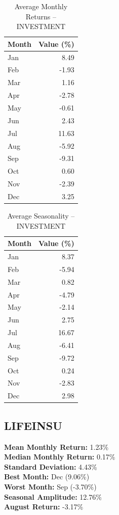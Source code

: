 \documentclass[12pt]{article}
\begin{document}
\begin{table}[h!]
\centering
\caption{Average Monthly Returns -- INVESTMENT}
\begin{tabular}{l r}
\toprule
Month & Value (\%) \\
\midrule
Jan & 8.49 \\
Feb & -1.93 \\
Mar & 1.16 \\
Apr & -2.78 \\
May & -0.61 \\
Jun & 2.43 \\
Jul & 11.63 \\
Aug & -5.92 \\
Sep & -9.31 \\
Oct & 0.60 \\
Nov & -2.39 \\
Dec & 3.25 \\
\bottomrule
\end{tabular}
\end{table}

\begin{table}[h!]
\centering
\caption{Average Seasonality -- INVESTMENT}
\begin{tabular}{l r}
\toprule
Month & Value (\%) \\
\midrule
Jan & 8.37 \\
Feb & -5.94 \\
Mar & 0.82 \\
Apr & -4.79 \\
May & -2.14 \\
Jun & 2.75 \\
Jul & 16.67 \\
Aug & -6.41 \\
Sep & -9.72 \\
Oct & 0.24 \\
Nov & -2.83 \\
Dec & 2.98 \\
\bottomrule
\end{tabular}
\end{table}


\clearpage

\subsection{LIFEINSU}
\textbf{Mean Monthly Return:} 1.23\% \\
\textbf{Median Monthly Return:} 0.17\% \\
\textbf{Standard Deviation:} 4.43\% \\
\textbf{Best Month:} Dec (9.06\%) \\
\textbf{Worst Month:} Sep (-3.70\%) \\
\textbf{Seasonal Amplitude:} 12.76\% \\
\textbf{August Return:} -3.17\% \\
\end{document}

